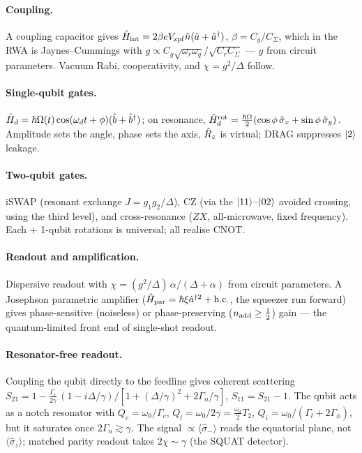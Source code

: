 \clearpage
\begin{chaptersummary}

\paragraph{Coupling.}
A coupling capacitor gives
$\hat{H}_{\rm int}=2\beta eV_{\rm zpf}\hat{n}(\hat a+\hat a^\dagger)$,
$\beta=C_g/C_\Sigma$, which in the RWA is Jaynes--Cummings with
$g\propto C_g\sqrt{\omega_r\omega_q}/\sqrt{C_rC_\Sigma}$ --- $g$ from
circuit parameters. Vacuum Rabi, cooperativity, and $\chi=g^2/\Delta$
follow.

\paragraph{Single-qubit gates.}
$\hat{H}_d=\hbar\Omega(t)\cos(\omega_dt+\phi)(\hat b+\hat b^\dagger)$;
on resonance,
$\hat{H}_d^{\rm rot}=\tfrac{\hbar\Omega}{2}(\cos\phi\,\hat\sigma_x+\sin\phi\,\hat\sigma_y)$.
Amplitude sets the angle, phase sets the axis, $\hat{R}_z$ is virtual;
DRAG suppresses $\ket2$ leakage.

\paragraph{Two-qubit gates.}
iSWAP (resonant exchange $J=g_1g_2/\Delta$), CZ (via the
$\ket{11}$--$\ket{02}$ avoided crossing, using the third level), and
cross-resonance ($ZX$, all-microwave, fixed frequency). Each + 1-qubit
rotations is universal; all realise CNOT.

\paragraph{Readout and amplification.}
Dispersive readout with $\chi=(g^2/\Delta)\,\alpha/(\Delta+\alpha)$
from circuit parameters. A Josephson parametric amplifier
($\hat{H}_{\rm par}=\hbar\xi\hat a^{\dagger2}+\text{h.c.}$, the squeezer run
forward) gives phase-sensitive (noiseless) or phase-preserving
($n_{\rm add}\ge\tfrac12$) gain --- the quantum-limited front end of
single-shot readout.

\paragraph{Resonator-free readout.}
Coupling the qubit directly to the feedline gives coherent scattering
$S_{21}=1-\tfrac{\Gamma_c}{2\gamma}\,(1-i\Delta/\gamma)/[1+(\Delta/\gamma)^2+2\Gamma_n/\gamma]$,
$S_{11}=S_{21}-1$. The qubit acts as a notch resonator with
$Q_c=\omega_0/\Gamma_c$, $Q_l=\omega_0/2\gamma=\tfrac{\omega_0}{2}T_2$,
$Q_i=\omega_0/(\Gamma_l+2\Gamma_\phi)$, but it saturates once
$2\Gamma_n\gtrsim\gamma$. The signal $\propto\langle\hat\sigma_-\rangle$
reads the equatorial plane, not $\langle\hat\sigma_z\rangle$; matched
parity readout takes $2\chi\sim\gamma$ (the SQUAT detector).

\end{chaptersummary}

